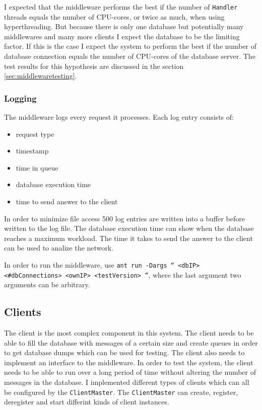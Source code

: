 \documentclass[
10pt, %
a4paper, %
oneside, %
headinclude,footinclude, %
BCOR5mm, %
]{scrartcl}
\begin{document}
I expected that the middleware performs the best if the number of \texttt{Handler} threads equals the number of CPU-cores, or twice as much, when using hyperthreading. But because there is only one database but potentially many middlewares and many more clients I expect the database to be the limiting factor. If this is the case I expect the system to perform the best if the number of database connection equals the number of CPU-cores of the database server. The test results for this hypothesis are discussed in the section \vref{sec:middlewaretesting}.


\subsubsection{Logging}
The middleware logs every request it processes. Each log entry consists of:
\begin{itemize}
\item request type
\item timestamp
\item time in queue
\item database execution time
\item time to send answer to the client
\end{itemize}

In order to minimize file access 500 log entries are written into a buffer before written to the log file. The database execution time can show when the database reaches a maximum workload. The time it takes to send the answer to the client can be used to analize the network.


In order to run the middleware, use \texttt{ant run -Dargs `` <dbIP> <\#dbConnections> <ownIP> <testVersion> ''}, where the last argument two arguments can be arbitrary.

\subsection{Clients}
The client is the most complex component in this system. The client needs to be able to fill the database with messages of a certain size and create queues in order to get database dumps which can be used for testing. The client also needs to implement an interface to the middleware. In order to test the system, the client needs to be able to run over a long period of time without altering the number of messages in the database. I implemented different types of clients which can all be configured by the \texttt{ClientMaster}. The \texttt{ClientMaster} can create, register, deregister and start differint kinds of client instances.
\end{document}
